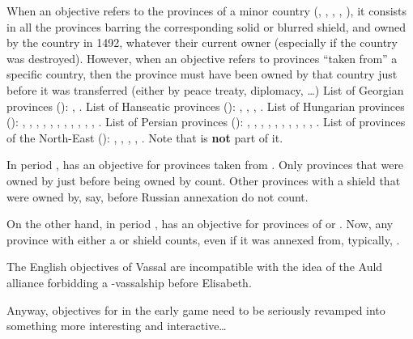  When an objective refers to the provinces of a
minor country (\paysGeorgie, \paysHanse, \paysHongrie, \paysPerse,
\paysprovincesne), it consists in all the provinces barring the
corresponding solid or blurred shield, and owned by the country in 1492,
whatever their current owner (especially if the country was destroyed).
\bparag However, when an objective refers to provinces ``taken from''
a specific country, then the province must have been owned by that
country just before it was transferred (either by peace treaty,
diplomacy, \ldots)
\bparag List of Georgian provinces ():
\provinceGeorgie, \provinceKuban.
\bparag List of Hanseatic provinces ():
\provinceBremen, \provinceLubeck, \provinceHolstein,
\provinceMecklenburg.
\bparag List of Hungarian provinces ():
\provinceMures, \provinceErdely, \provinceBukovina, \provinceKarpatok,
\provinceSzlovakia, \provinceBalaton, \provinceCarniola,
\provinceKapela, \provinceCroatie, \provincePecs, \provinceMagyarorszag,
\provinceBanat.
\bparag List of Persian provinces (): \provincePars,
\provinceMeshhed, \provinceBam, \provinceIsfahan, \provinceKermanshah,
\provinceAzarbayadjan, \provinceKordistan, \provinceVan,
\provinceArmenie, \provinceShirvan, \provinceDagestan.
\bparag List of provinces of the North-East ():
\provinceFriesland, \provinceGelderland, \provinceHolland,
\provinceOverijssel, \provinceUtrecht. Note that \provinceZeeland is
\textbf{not} part of it.

\begin{exemple}
  In period , \RUS has an objective for provinces taken from
  \paysCrimee. Only provinces that were owned by \paysCrimee just before
  being owned by \RUS count. Other provinces with a 
  shield that were owned by, say, \paysUkraine before Russian annexation
  do not count.

  On the other hand, in period , \RUS has an objective for
  provinces of \paysGeorgie or \paysPerse. Now, any province with either
  a  or  shield counts, even if
  it was annexed from, typically, \TUR.
\end{exemple}

\begin{todo}
  The English objectives of \paysEcosse Vassal are incompatible with the
  idea of the Auld alliance forbidding a \ANG-\paysEcosse vassalship
  before Elisabeth.

  Anyway, objectives for \ANG in the early game need to be seriously
  revamped into something more interesting and interactive\ldots
\end{todo}


